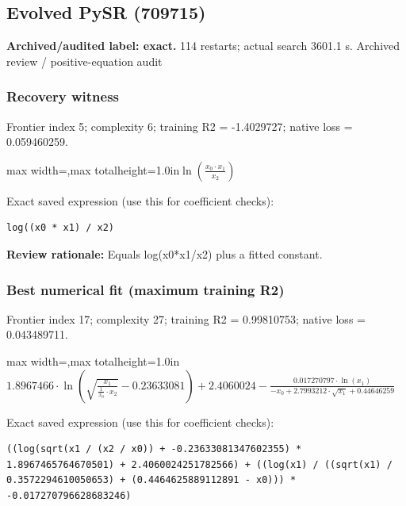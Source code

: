 \documentclass[10pt,letterpaper,landscape]{article}
\begin{document}
\begin{minipage}[t]{0.485\textwidth}
\subsection*{Evolved PySR (709715)}
\textbf{Archived/audited label: exact.} 114 restarts; actual search 3601.1 s.
{\small Archived review / positive-equation audit}
\subsubsection*{Recovery witness}
Frontier index 5; complexity 6; training R2 = -1.4029727; native loss = 0.059460259.
\begin{center}\begin{adjustbox}{max width=\linewidth,max totalheight=1.0in}$\displaystyle \ln{\left(\frac{x_{0} \cdot x_{1}}{x_{2}} \right)}$\end{adjustbox}\end{center}
{\scriptsize Exact saved expression (use this for coefficient checks):}
\begin{lstlisting}
log((x0 * x1) / x2)
\end{lstlisting}
{\small\textbf{Review rationale:} Equals log(x0*x1/x2) plus a fitted constant.}
\subsubsection*{Best numerical fit (maximum training R2)}
Frontier index 17; complexity 27; training R2 = 0.99810753; native loss = 0.043489711.
\begin{center}\begin{adjustbox}{max width=\linewidth,max totalheight=1.0in}$\displaystyle 1.8967466 \cdot \ln{\left(\sqrt{\frac{x_{1}}{\frac{1}{x_{0}} \cdot x_{2}}} - 0.23633081 \right)} + 2.4060024 - \frac{0.017270797 \cdot \ln{\left(x_{1} \right)}}{- x_{0} + 2.7993212 \cdot \sqrt{x_{1}} + 0.44646259}$\end{adjustbox}\end{center}
{\scriptsize Exact saved expression (use this for coefficient checks):}
\begin{lstlisting}
((log(sqrt(x1 / (x2 / x0)) + -0.23633081347602355) * 1.8967465764670501) + 2.4060024251782566) + ((log(x1) / ((sqrt(x1) / 0.3572294610050653) + (0.4464625889112891 - x0))) * -0.017270796628683246)
\end{lstlisting}
\end{minipage}
\clearpage{}\label{ideal_gas-10003}
\end{document}
